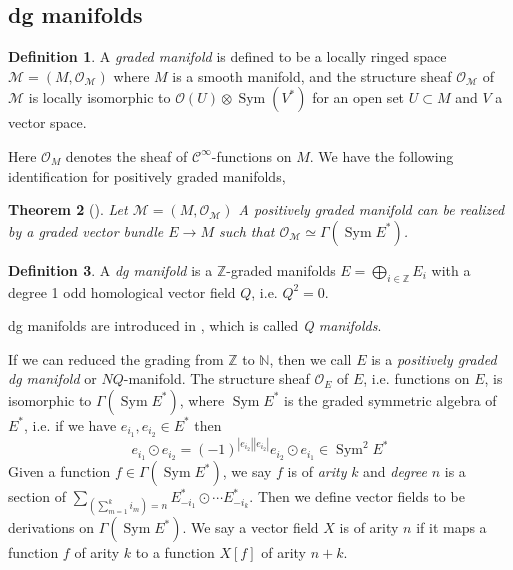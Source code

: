 \documentclass[12pt]{amsart}
\newtheorem{thm}{Theorem}[section]
\theoremstyle{definition}
\newtheorem{defn}[thm]{Definition}
\theoremstyle{remark}
\numberwithin{equation}{section}
\newcommand{\CO}{{\mathcal O}}
\newcommand{\cinf}{{\mathcal C}^{\infty}}
\newcommand{\Z}{{\mathbb{Z}}}
\newcommand{\N}{{\mathbb{N}}}
\newcommand{\1}{{\mathbb{1}}}
\newcommand{\its}{\textit}
\newcommand{\sym}{\operatorname{Sym}}
\begin{document}
\subsection{dg manifolds}

\begin{defn}
    A {\it graded manifold} is defined to be a locally ringed space $\mathcal{M}=(M,\CO_{\mathcal{M}})$ where $M$ is a smooth manifold, and the structure sheaf $\CO_{\mathcal{M}}$ of $\mathcal{M}$ is locally isomorphic to $\CO(U)\otimes \sym (V^*)$ for an open set $U\subset M$ and $V$ a vector space. 
\end{defn}

Here $\CO_M$ denotes the  sheaf of $\cinf$-functions on $M$. We have the following identification for positively graded manifolds,
\begin{thm}[\cite{Bat79}]
    Let $\mathcal{M} = (M,\CO_{\mathcal{M}})$ A positively graded manifold  can be realized by a graded vector bundle $E\to M$ such that $\CO_{\mathcal{M}} \simeq \Gamma (\sym E^*)$.
\end{thm}

\begin{defn}
    A {\it dg manifold} is a $\Z$-graded manifolds $E=\bigoplus_{i\in \Z} E_i$ with a degree 1 odd homological vector field $Q$, i.e. $Q^2=0$.
\end{defn}
dg manifolds are introduced in \cite{AKSZ97}, which is called {\it Q manifolds}.

If we can reduced the grading from $\Z$ to $\N$, then we call $E$ is a {\it positively graded dg manifold} or $NQ$-manifold. The structure sheaf $\CO_E$ of $E$, i.e. functions on $E$, is isomorphic to $\Gamma(\sym E^*)$, where $\sym E^*$ is the graded symmetric algebra of $E^*$, i.e. if we have $e_{i_1}, e_{i_2}\in E^*$ then
\begin{equation*}
e_{i_1} \odot e_{i_2}=(-1)^{|e_{i_2}| |e_{i_2}| } e_{i_2}\odot e_{i_1} \in \sym^2 E^*
\end{equation*}
Given a function $f\in \Gamma(\sym E^*)$, we say $f$ is of \its{arity} $k$ and \its{degree} $n$ is a section of $\sum_{(\sum_{m=1}^k i_m)=n} E^*_{-i_1}\odot \cdots E^*_{-i_k}$. Then we define vector fields to be derivations on $\Gamma(\sym E^*)$. We say a vector field $X$ is of arity $n$ if it maps a function $f$ of arity $k$ to a function $X[f]$ of arity $n+k$.
\end{document}
